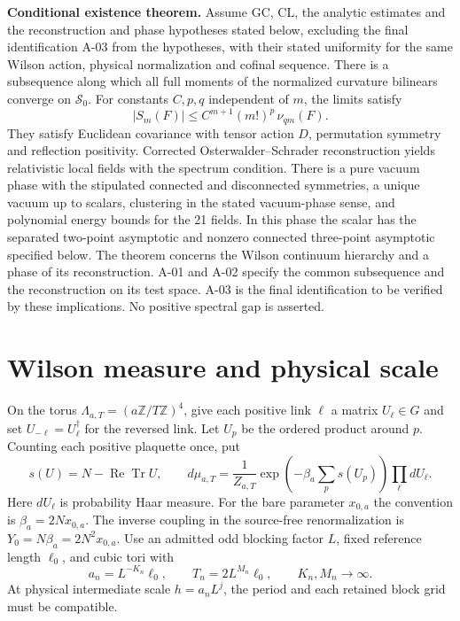\documentclass[11pt,letterpaper]{article}
\begin{document}
\medskip\noindent\textbf{Conditional existence theorem.}
Assume GC, CL, the analytic estimates and the reconstruction and phase hypotheses
stated below, excluding the final identification A-03 from the hypotheses,
with their stated uniformity for the same Wilson action,
physical normalization and cofinal sequence.
There is a subsequence along which all full moments of the normalized
curvature bilinears converge on \(\mathcal S_0\). For constants \(C,p,q\)
independent of \(m\), the limits satisfy
\[
       |S_m(F)|\le C^{m+1}(m!)^p\,\nu_{qm}(F).
\]
They satisfy Euclidean covariance with tensor action \(D\), permutation
symmetry and reflection positivity. Corrected Osterwalder--Schrader
reconstruction yields relativistic local fields with the spectrum condition.
There is a pure vacuum phase with the stipulated connected and disconnected
symmetries, a unique vacuum up to scalars, clustering in the stated
vacuum-phase sense, and polynomial energy bounds for the 21 fields.
In this phase the scalar has the separated two-point asymptotic and
nonzero connected three-point asymptotic specified below. The theorem
concerns the Wilson continuum hierarchy and a phase of its reconstruction.
A-01 and A-02 specify the common subsequence and the reconstruction on its test space. A-03 is the final identification to be verified by these implications. No positive spectral gap is asserted.

\section{Wilson measure and physical scale}

On the torus \(\Lambda_{a,T}=(a\mathbb Z/T\mathbb Z)^4\), give each positive
link \(\ell\) a matrix \(U_\ell\in G\) and set \(U_{-\ell}=U_\ell^\dagger\)
for the reversed link. Let \(U_p\) be the ordered product around \(p\).
Counting each positive plaquette once, put
\[
 s(U)=N-\operatorname{Re}\operatorname{Tr}U,\qquad
 d\mu_{a,T}=\frac{1}{Z_{a,T}}\exp\!\left(-\beta_a\sum_p s(U_p)\right)
                     \prod_\ell dU_\ell .
\]
Here \(dU_\ell\) is probability Haar measure. For the bare parameter
\(x_{0,a}\) the convention is \(\beta_a=2Nx_{0,a}\). The inverse coupling
in the source-free renormalization is \(Y_0=N\beta_a=2N^2x_{0,a}\).
Use an admitted odd blocking factor \(L\), fixed reference length
\(\ell_0\), and cubic tori with
\[
 a_n=L^{-K_n}\ell_0,\qquad T_n=2L^{M_n}\ell_0,\qquad K_n,M_n\longrightarrow\infty .
\]
At physical intermediate scale \(h=a_nL^j\), the period and each retained
block grid must be compatible.
\end{document}

